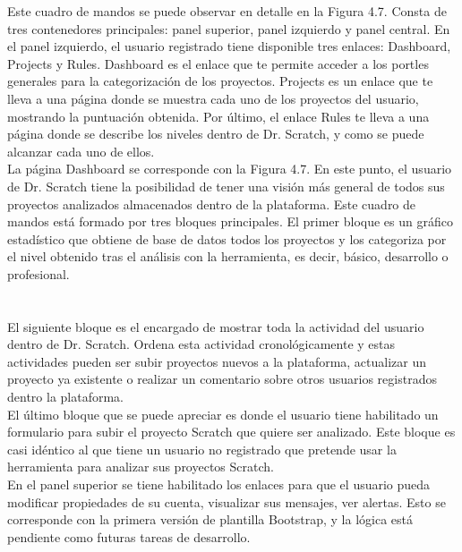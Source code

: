 \documentclass[a4paper, 12pt]{book}
\begin{document}
Este cuadro de mandos se puede observar en detalle en la Figura 4.7. Consta de tres 
contenedores principales: panel superior, panel izquierdo y panel central.
En el panel izquierdo, el usuario registrado tiene disponible tres enlaces: Dashboard,
Projects y Rules. Dashboard es el enlace que te permite acceder a los portles generales
para la categorización de los proyectos. Projects es un enlace que te lleva a una 
página donde se muestra cada uno de los proyectos del usuario, mostrando la puntuación
obtenida. Por último, el enlace Rules te lleva a una página donde se describe los niveles
dentro de Dr. Scratch, y como se puede alcanzar cada uno de ellos. \\

La página Dashboard se corresponde con la Figura 4.7. En este punto, el usuario de 
Dr. Scratch tiene la posibilidad de tener una visión más general de todos sus proyectos
analizados almacenados dentro de la plataforma. Este cuadro de mandos está formado por
tres bloques principales. El primer bloque es un gráfico estadístico que obtiene de 
base de datos todos los proyectos y los categoriza por el nivel obtenido tras el 
análisis con la herramienta, es decir, básico, desarrollo o profesional. \\ \\ \\

El siguiente bloque es el encargado de mostrar toda la actividad del usuario dentro de Dr. Scratch.
Ordena esta actividad cronológicamente y estas actividades pueden ser subir proyectos 
nuevos a la plataforma, actualizar un proyecto ya existente o realizar un comentario sobre
otros usuarios registrados dentro la plataforma. \\

El último bloque que se puede apreciar es donde el usuario tiene habilitado un formulario 
para subir el proyecto Scratch que quiere ser analizado. Este bloque es casi idéntico al 
que tiene un usuario no registrado que  pretende usar la herramienta para analizar sus
 proyectos Scratch. \\ 

En el panel superior se tiene habilitado los enlaces para que el usuario pueda modificar
propiedades de su cuenta, visualizar sus mensajes, ver alertas. Esto se corresponde con
la primera versión de plantilla Bootstrap, y la lógica está pendiente como futuras tareas
de desarrollo. \\ \\ \\
\end{document}
